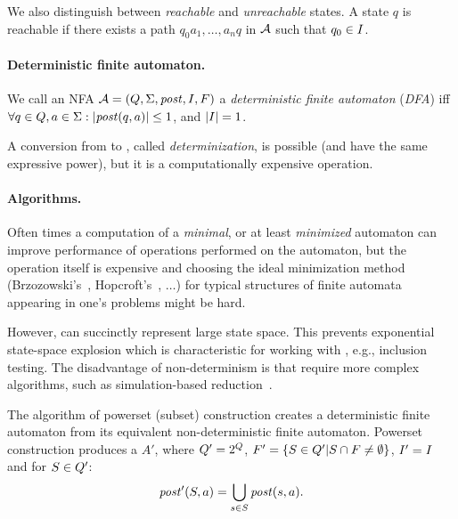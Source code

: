 We also distinguish between \emph{reachable} and \emph{unreachable} states.
A state $q$ is reachable if there exists a path $q_0a_1, \ldots, a_nq$ in $\mathcal{A}$ such that $q_0 \in I$.


\paragraph{Deterministic finite automaton.}
We call an NFA $\mathcal{A} = (Q, \Sigma
, \mathit{post}, I, F)$ a \emph{deterministic finite automaton} (\emph{DFA}) iff
$\forall q \in Q, a \in \Sigma: |\mathit{post}(q, a)| \leq 1
$, and $|I| = 1$.

A conversion from \nfa to \dfa, called \emph{determinization}, is possible (\nfas and \dfas have the same expressive power), but it is a computationally expensive operation.

\paragraph{Algorithms.}

Often times a computation of a \emph{minimal}, or at least \emph{minimized} automaton can improve performance of operations performed on the automaton, but the operation itself is expensive and choosing the ideal minimization method (Brzozowski's~\cite{Brzozowski1962CanonicalRE}, Hopcroft's~\cite{hopcroft_71}, $\ldots$) for typical structures of finite automata appearing in one's problems might be hard.

However, \nfas can succinctly represent large state space.
This prevents exponential state-space explosion which is characteristic for working with \dfas, e.g., inclusion testing.
The disadvantage of non-determinism is that \nfas require more complex algorithms, such as simulation-based reduction~\cite{ranzato_efficient_2010, holik_optimizing_2009, HHK95}.

\begin{definition} \hfill \newline
    The algorithm of powerset (subset) construction creates a deterministic finite automaton from its equivalent non-deterministic finite automaton. Powerset construction produces a \dfa $A'$, where $Q' = 2^Q$, $F' = \{S \in Q' | S \cap F \neq \emptyset\}$, $I' = I$ and for
    $S \in Q'$:
    $$\mathit{post}'(S, a) = \bigcup_{s \in S} \mathit{post}(s, a)\text{.}$$
\end{definition}

